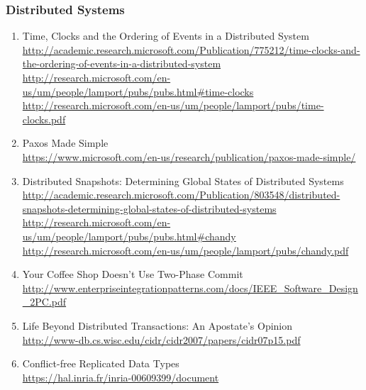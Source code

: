\documentclass{article}
\begin{document}
\subsubsection{Distributed Systems}
\begin{enumerate}
	\item {Time, Clocks and the Ordering of Events in a Distributed System\\		
\href{http://academic.research.microsoft.com/Publication/775212/time-clocks-and-the-ordering-of-events-in-a-distributed-system}{http://academic.research.microsoft.com/Publication/775212/time-clocks-and-the-ordering-of-events-in-a-distributed-system}\\
\href{http://research.microsoft.com/en-us/um/people/lamport/pubs/pubs.html#time-clocks}{http://research.microsoft.com/en-us/um/people/lamport/pubs/pubs.html\#time-clocks}\\
\href{http://research.microsoft.com/en-us/um/people/lamport/pubs/time-clocks.pdf}{http://research.microsoft.com/en-us/um/people/lamport/pubs/time-clocks.pdf}}
	\item {Paxos Made Simple\\
	\url{https://www.microsoft.com/en-us/research/publication/paxos-made-simple/}}
	\item {Distributed Snapshots: Determining Global States of Distributed Systems\\
\href{http://academic.research.microsoft.com/Publication/803548/distributed-snapshots-determining-global-states-of-distributed-systems}{http://academic.research.microsoft.com/Publication/803548/distributed-snapshots-determining-global-states-of-distributed-systems}\\
\href{http://research.microsoft.com/en-us/um/people/lamport/pubs/pubs.html#chandy}{http://research.microsoft.com/en-us/um/people/lamport/pubs/pubs.html\#chandy}\\
\href{http://research.microsoft.com/en-us/um/people/lamport/pubs/chandy.pdf}{http://research.microsoft.com/en-us/um/people/lamport/pubs/chandy.pdf}}
	\item {Your Coffee Shop Doesn’t Use Two-Phase Commit\\
\href{http://www.enterpriseintegrationpatterns.com/docs/IEEE_Software_Design_2PC.pdf}{http://www.enterpriseintegrationpatterns.com/docs/IEEE\_Software\_Design\_2PC.pdf}}
	\item {Life Beyond Distributed Transactions: An Apostate’s Opinion\\
\url{http://www-db.cs.wisc.edu/cidr/cidr2007/papers/cidr07p15.pdf}}
	\item {Conﬂict-free Replicated Data Types\\ \url{https://hal.inria.fr/inria-00609399/document}}
\end{enumerate}
\end{document}
